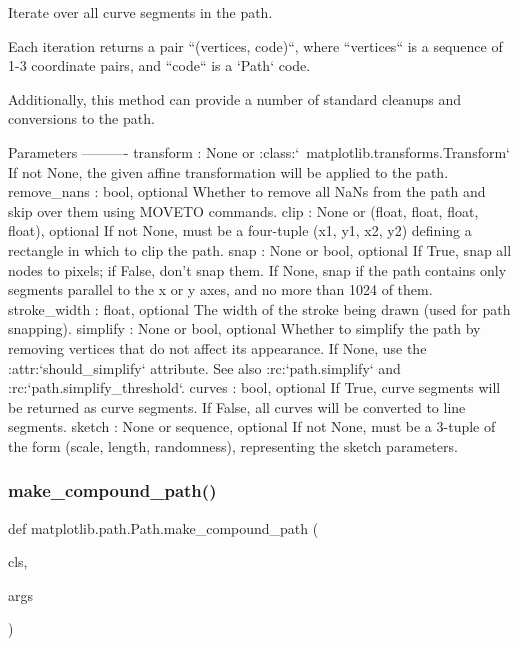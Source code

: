 \begin{DoxyVerb}Iterate over all curve segments in the path.

Each iteration returns a pair ``(vertices, code)``, where ``vertices``
is a sequence of 1-3 coordinate pairs, and ``code`` is a `Path` code.

Additionally, this method can provide a number of standard cleanups and
conversions to the path.

Parameters
----------
transform : None or :class:`~matplotlib.transforms.Transform`
    If not None, the given affine transformation will be applied to the
    path.
remove_nans : bool, optional
    Whether to remove all NaNs from the path and skip over them using
    MOVETO commands.
clip : None or (float, float, float, float), optional
    If not None, must be a four-tuple (x1, y1, x2, y2)
    defining a rectangle in which to clip the path.
snap : None or bool, optional
    If True, snap all nodes to pixels; if False, don't snap them.
    If None, snap if the path contains only segments
    parallel to the x or y axes, and no more than 1024 of them.
stroke_width : float, optional
    The width of the stroke being drawn (used for path snapping).
simplify : None or bool, optional
    Whether to simplify the path by removing vertices
    that do not affect its appearance.  If None, use the
    :attr:`should_simplify` attribute.  See also :rc:`path.simplify`
    and :rc:`path.simplify_threshold`.
curves : bool, optional
    If True, curve segments will be returned as curve segments.
    If False, all curves will be converted to line segments.
sketch : None or sequence, optional
    If not None, must be a 3-tuple of the form
    (scale, length, randomness), representing the sketch parameters.
\end{DoxyVerb}
 \mbox{\label{classmatplotlib_1_1path_1_1Path_a7d24e4d289747430ff11d550d89be076}} 
\subsubsection{\texorpdfstring{make\+\_\+compound\+\_\+path()}{make\_compound\_path()}}
{\footnotesize\ttfamily def matplotlib.\+path.\+Path.\+make\+\_\+compound\+\_\+path (\begin{DoxyParamCaption}\item[{}]{cls,  }\item[{}]{args }\end{DoxyParamCaption})}

